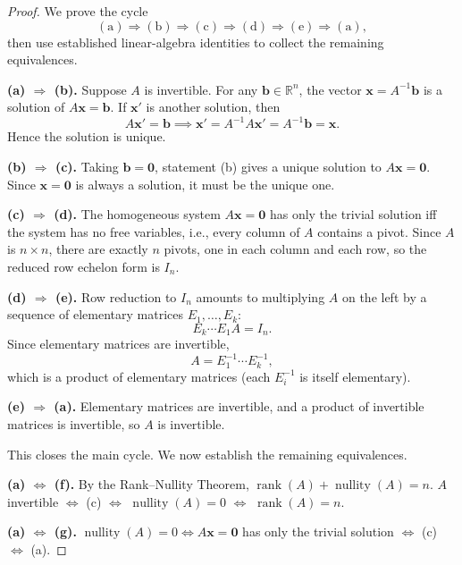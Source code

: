 \documentclass[11pt]{article}
\theoremstyle{definition}
\begin{document}
\begin{proof}
We prove the cycle
\[
(\mathrm{a}) \Rightarrow (\mathrm{b}) \Rightarrow (\mathrm{c}) \Rightarrow (\mathrm{d}) \Rightarrow (\mathrm{e}) \Rightarrow (\mathrm{a}),
\]
then use established linear-algebra identities to collect the remaining equivalences.

\medskip
\noindent\textbf{(a) $\Rightarrow$ (b).}
Suppose $A$ is invertible. For any $\mathbf{b} \in \mathbb{R}^n$, the vector $\mathbf{x} = A^{-1}\mathbf{b}$ is a solution of $A\mathbf{x} = \mathbf{b}$. If $\mathbf{x}'$ is another solution, then
\[
A\mathbf{x}' = \mathbf{b} \implies \mathbf{x}' = A^{-1}A\mathbf{x}' = A^{-1}\mathbf{b} = \mathbf{x}.
\]
Hence the solution is unique.

\medskip
\noindent\textbf{(b) $\Rightarrow$ (c).}
Taking $\mathbf{b} = \mathbf{0}$, statement (b) gives a unique solution to $A\mathbf{x} = \mathbf{0}$. Since $\mathbf{x} = \mathbf{0}$ is always a solution, it must be the unique one.

\medskip
\noindent\textbf{(c) $\Rightarrow$ (d).}
The homogeneous system $A\mathbf{x} = \mathbf{0}$ has only the trivial solution iff the system has no free variables, i.e., every column of $A$ contains a pivot. Since $A$ is $n \times n$, there are exactly $n$ pivots, one in each column and each row, so the reduced row echelon form is $I_n$.

\medskip
\noindent\textbf{(d) $\Rightarrow$ (e).}
Row reduction to $I_n$ amounts to multiplying $A$ on the left by a sequence of elementary matrices $E_1, \ldots, E_k$:
\[
E_k \cdots E_1 A = I_n.
\]
Since elementary matrices are invertible,
\[
A = E_1^{-1} \cdots E_k^{-1},
\]
which is a product of elementary matrices (each $E_i^{-1}$ is itself elementary).

\medskip
\noindent\textbf{(e) $\Rightarrow$ (a).}
Elementary matrices are invertible, and a product of invertible matrices is invertible, so $A$ is invertible.

\medskip\noindent
This closes the main cycle. We now establish the remaining equivalences.

\medskip
\noindent\textbf{(a) $\Leftrightarrow$ (f).}
By the Rank--Nullity Theorem, $\operatorname{rank}(A) + \operatorname{nullity}(A) = n$.
$A$ invertible $\Leftrightarrow$ (c) $\Leftrightarrow$ $\operatorname{nullity}(A) = 0$ $\Leftrightarrow$ $\operatorname{rank}(A) = n$.

\medskip
\noindent\textbf{(a) $\Leftrightarrow$ (g).}
$\operatorname{nullity}(A) = 0 \Leftrightarrow A\mathbf{x}=\mathbf{0}$ has only the trivial solution $\Leftrightarrow$ (c) $\Leftrightarrow$ (a).


\end{proof}
\end{document}
